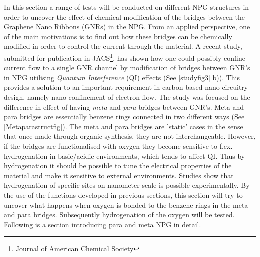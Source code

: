 In this section a range of tests will be conducted on different NPG structures in order to uncover the effect of chemical modification of the bridges between the Graphene Nano Ribbons (GNRs) in the NPG. From an applied perspective, one of the main motivations is to find out how these bridges can be chemically modified in order to control the current through the material. A recent study\cite{unpub}, submitted for publication in JACS\footnote{\href{https://pubs.acs.org/journal/jacsat}{Journal of American Chemical Society}}, has shown how one could possibly confine current flow to a single GNR channel by modification of bridges between GNR's in NPG utilising \textit{Quantum Interference} (QI) effects (See \cref{studyfig3} b)). This provides a solution to an important requirement in carbon-based nano circuitry design, namely nano confinement of electron flow. The study was focused on the difference in effect of having \textit{meta} and \textit{para} bridges between GNR's. Meta and para bridges are essentially benzene rings connected in two different ways (See \cref{Metaparastructfig}). The meta and para bridges are 'static' cases in the sense that once made through organic synthesis, they are not interchangeable. However, if the bridges are functionalised with oxygen\cite{Soler_2002} they become sensitive to f.ex. hydrogenation in basic/acidic environments, which tends to affect QI. Thus by hydrogenation it should be possible to tune the electrical properties of the material and make it sensitive to external environments. Studies\cite{li_single_2019} show that hydrogenation of specific sites on nanometer scale is possible experimentally. By the use of the functions developed in previous sections, this section will try to uncover what happens when oxygen is bonded to the benzene rings in the meta and para bridges. Subsequently hydrogenation of the oxygen will be tested. Following is a section introducing para and meta NPG in detail.
